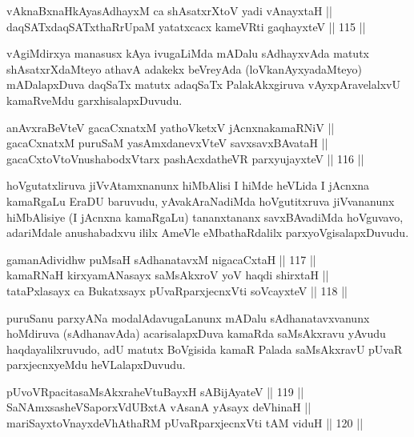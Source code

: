 \begin{shl}
vAknaBxnaHkAyasAdhayxM ca shAsatxrXtoV yadi vA\s nayxtaH || \\
daqSATxdaqSATxthaRrUpaM yatatxcacx kameVRti gaqhayxteV \hfill || 115 ||  
\end{shl}

\begin{artha}
vAgiMdirxya manasusx kAya ivugaLiMda mADalu sAdhayxvAda matutx
shAsatxrXdaMteyo athavA adakekx beVreyAda (loVkanAyxyadaMteyo)
mADalapxDuva daqSaTx matutx adaqSaTx PalakAkxgiruva vAyxpAravelalxvU
kamaRveMdu garxhisalapxDuvudu.
\end{artha}

\begin{shl}
anAvxraBeVteV gacaCxnatxM yathoVketxV jAcnxnakamaRNiV || \\
gacaCxnatxM puruSaM yasAmxdanevxVteV savxsavxBAvataH || \\
gacaCxtoV\s toV\s nushabodxV\s tarx pashAcxdatheVR parxyujayxteV \hfill || 116 ||  
\end{shl}

\begin{artha}
hoVgutatxliruva jiVvAtamxnanunx hiMbAlisi I hiMde heVLida I jAcnxna
kamaRgaLu EraDU baruvudu, yAvakAraNadiMda hoVgutitxruva jiVvananunx
hiMbAlisiye (I jAcnxna kamaRgaLu) tananxtananx savxBAvadiMda
hoVguvavo, adariMdale anushabadxvu ililx AmeVle eMbathaRdalilx
parxyoVgisalapxDuvudu.
\end{artha}


\begin{shl}
gamanAdividhw puMsaH sAdhanatavxM nigacaCxtaH \hfill || 117 ||  \\
kamaRNaH kirxyamANasayx saMsAkxroV yoV haqdi shirxtaH || \\
tataPxlasayx ca Bukatxsayx pUvaRparxjecnxVti soVcayxteV \hfill || 118 ||  
\end{shl}

\begin{artha}
puruSanu parxyANa modalAdavugaLanunx mADalu sAdhanatavxvanunx
hoMdiruva (sAdhanavAda) acarisalapxDuva kamaRda saMsAkxravu yAvudu
haqdayalilxruvudo, adU matutx BoVgisida kamaR Palada saMsAkxravU pUvaR
parxjecnxyeMdu heVLalapxDuvudu.
\end{artha}

\begin{shl}
pUvoVRpacitasaMsAkxraheVtuBayxH sA\s BijAyateV \hfill || 119 || \\
SaNAmxsasheVSaporxVdUBxtA vAsanA yA\s sayx deVhinaH || \\
mariSayxtoV\s nayxdeVhAthaRM pUvaRparxjecnxVti tAM viduH \hfill || 120 ||  
\end{shl}

